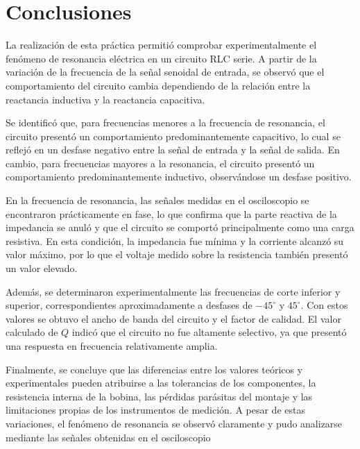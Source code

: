 \section{Conclusiones}

La realización de esta práctica permitió comprobar experimentalmente el fenómeno de resonancia eléctrica en un circuito RLC serie. A partir de la variación de la frecuencia de la señal senoidal de entrada, se observó que el comportamiento del circuito cambia dependiendo de la relación entre la reactancia inductiva y la reactancia capacitiva.

\vspace{5pt}

Se identificó que, para frecuencias menores a la frecuencia de resonancia, el circuito presentó un comportamiento predominantemente capacitivo, lo cual se reflejó en un desfase negativo entre la señal de entrada y la señal de salida. En cambio, para frecuencias mayores a la resonancia, el circuito presentó un comportamiento predominantemente inductivo, observándose un desfase positivo.

\vspace{5pt}

En la frecuencia de resonancia, las señales medidas en el osciloscopio se encontraron prácticamente en fase, lo que confirma que la parte reactiva de la impedancia se anuló y que el circuito se comportó principalmente como una carga resistiva. En esta condición, la impedancia fue mínima y la corriente alcanzó su valor máximo, por lo que el voltaje medido sobre la resistencia también presentó un valor elevado.

\vspace{5pt}

Además, se determinaron experimentalmente las frecuencias de corte inferior y superior, correspondientes aproximadamente a desfases de $-45^\circ$ y $45^\circ$. Con estos valores se obtuvo el ancho de banda del circuito y el factor de calidad. El valor calculado de $Q$ indicó que el circuito no fue altamente selectivo, ya que presentó una respuesta en frecuencia relativamente amplia.

\vspace{5pt}

Finalmente, se concluye que las diferencias entre los valores teóricos y experimentales pueden atribuirse a las tolerancias de los componentes, la resistencia interna de la bobina, las pérdidas parásitas del montaje y las limitaciones propias de los instrumentos de medición. A pesar de estas variaciones, el fenómeno de resonancia se observó claramente y pudo analizarse mediante las señales obtenidas en el osciloscopio